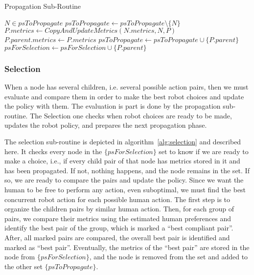 \begin{algorithm}
\caption{Propagation Sub-Routine}\label{alg:propagation}
\begin{algorithmic}[1]

    \State $N \in psToPropagate$
    \State $psToPropagate \gets psToPropagate \setminus \{N\}$
        \State $P.metrics \gets CopyAndUpdateMetrics(N.metrics, N, P)$
            \State $P.parent.metrics \gets P.metrics$
            \State $psToPropagate \gets psToPropagate \cup \{P.parent\}$
        \Else
            \State $psForSelection \gets psForSelection \cup \{P.parent\}$
        \EndIf
    \EndFor
\EndWhile

\end{algorithmic}
\end{algorithm}



    \subsubsection{Selection}

When a node has several children, i.e. several possible action pairs, then we must evaluate and compare them in order to make the best robot choices and update the policy with them. The evaluation is part is done by the propagation sub-routine. The Selection one checks when robot choices are ready to be made, updates the robot policy, and prepares the next propagation phase. 

The selection sub-routine is depicted in algorithm~\ref{alg:selection} and described here. It checks every node in the $\{psForSelection\}$ set to know if we are ready to make a choice, i.e., if every child pair of that node has metrics stored in it and has been propagated. 
If not, nothing happens, and the node remains in the set.
If so, we are ready to compare the pairs and update the policy. Since we want the human to be free to perform any action, even suboptimal, we must find the best concurrent robot action for each possible human action. The first step is to organize the children pairs by similar human action. Then, for each group of pairs, we compare their metrics using the estimated human preferences and identify the best pair of the group, which is marked a ``best compliant pair''. After, all marked pairs are compared, the overall best pair is identified and marked as ``best pair''. Eventually, the metrics of the ``best pair'' are stored in the node from $\{psForSelection\}$, and the node is removed from the set and added to the other set $\{psToPropagate\}$.

